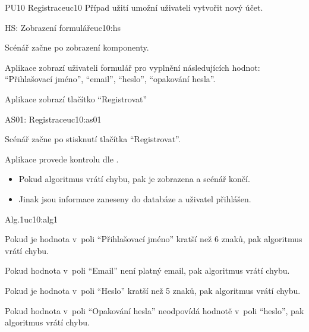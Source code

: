 \begin{usecase}{PU10 Registrace}{uc10}
    Případ užití umožní uživateli vytvořit nový účet.

    \begin{scenario}{HS: Zobrazení formuláře}{uc10:hs}
        \item Scénář začne po zobrazení komponenty.
        \item Aplikace zobrazí uživateli formulář pro vyplnění následujících hodnot: \enquote{Přihlašovací jméno}, \enquote{email}, \enquote{heslo}, \enquote{opakování hesla}.
        \item Aplikace zobrazí tlačítko \enquote{Registrovat}
    \end{scenario}

    \begin{scenario}{AS01: Registrace}{uc10:as01}
        \item Scénář začne po stisknutí tlačítka \enquote{Registrovat}.
        \item Aplikace provede kontrolu dle .
        \begin{itemize}
            \item Pokud algoritmus vrátí chybu, pak je zobrazena a scénář končí.
            \item Jinak jsou informace zaneseny do databáze a uživatel přihlášen.
        \end{itemize}
    \end{scenario}

    \begin{scenario}{Alg.1}{uc10:alg1}
        \item Pokud je hodnota v~poli \enquote{Přihlašovací jméno} kratší než 6 znaků, pak algoritmus vrátí chybu.
        \item Pokud hodnota v~poli \enquote{Email} není platný email, pak algoritmus vrátí chybu.
        \item Pokud je hodnota v~poli \enquote{Heslo} kratší než 5 znaků, pak algoritmus vrátí chybu.
        \item Pokud hodnota v~poli \enquote{Opakování hesla} neodpovídá hodnotě v~poli \enquote{heslo}, pak algoritmus vrátí chybu.
    \end{scenario}
\end{usecase}
